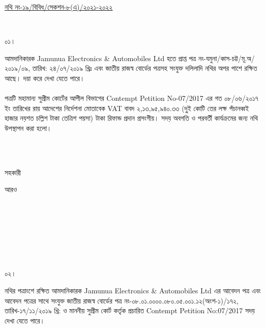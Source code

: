 \documentclass[12pt]{article}
\newcommand{\fileno}{নথি নং-১৯/বিবিধ/সেকশন-৮(এ)/২০২১-২০২২}
\newcommand{\nbrl}{নং-০৮.০১.০০০০.০৮০.০৫.০০১.১২(অংশ-১)/১৭২, তারিখ-১৭/১১/২০১৯ খ্রি:}
\newcommand{\tvat}{২,১৩,৯৫,৯৪০.৩৩ (দু্ই কোটি তের লক্ষ পঁচানব্বই হাজার নয়শত চল্লিশ টাকা তেত্রিশ পয়সা) টাকা}
\begin{document}
\begin{minipage}[t]{0.59\linewidth}
\hspace{0.5em}
\end{minipage}
\begin{minipage}[t]{1\textwidth}
\underline{{\fileno}}
\end{minipage}
\\
\begin{minipage}[t]{0.05\linewidth}
০১।
\end{minipage}
\begin{minipage}[t]{1\linewidth}
আমদানিকারক
Jamunua Electronics \& Automobiles Ltd
হতে প্রাপ্ত
পত্র নং-যমুনা/কাস-চট্ট/মূ.অ/২০১৯/০৯,
তারিখ: ২৪/০৭/২০১৯ খ্রিঃ
এবং জাতীয় রাজস্ব বোর্ডের পত্রসহ সংযুক্ত
দলিলাদি নথির অপর পাশে রক্ষিত আছে।
দয়া করে দেখা যেতে পারে।
\\
\\
পত্রটি মহামান্য সুপ্রীম কোর্টের আপীল বিভাগের
Contempt Petition No-07/2017
এর গত ০৮/০৬/২০১৭ ইং তারিখের
রায় আদেশের নির্দেশনা মোতাবেক
VAT বাবদ
{\tvat} রিফান্ড প্রদান প্রসংগীয়।
সদয় অবগতি ও পরবর্তী কার্যক্রমের জন্য
নথি উপস্থাপন করা হলো।
\end{minipage}
\\
\\
\begin{minipage}[t]{0.05\linewidth}
\hspace{1em}
\end{minipage}
\begin{minipage}[t]{.5\linewidth}
সহকারী
\end{minipage}
\begin{minipage}[t]{1\linewidth}
আরও
\end{minipage}
\\
\\
\\
\\
\\
\\
\begin{minipage}[t]{0.05\linewidth}
০২।
\end{minipage}
\begin{minipage}[t]{1\linewidth}
নথির পত্রাংশে রক্ষিত আমদানিকারক
Jamunua Electronics \& Automobiles Ltd
এর আবেদন পত্র এবং আবেদন পত্রের সাথে সংযুক্ত
জাতীয় রাজস্ব বোর্ডের পত্র
{\nbrl} ও মাননীয় সুপ্রীম কোর্ট কর্তৃক প্রচারিত
Contempt Petition No:07/2017
সদয় দেখা যেতে পারে।
\end{minipage}
\\
\\
\\
\end{document}

